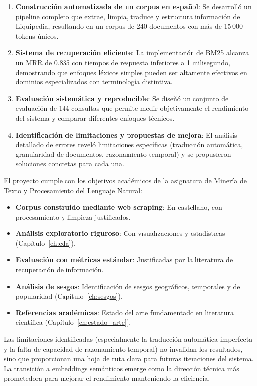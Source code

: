 \begin{enumerate}
    \item \textbf{Construcción automatizada de un corpus en español}: Se desarrolló un pipeline completo que extrae, limpia, traduce y estructura información de Liquipedia, resultando en un corpus de 240 documentos con más de 15\,000 tokens únicos.
    
    \item \textbf{Sistema de recuperación eficiente}: La implementación de BM25 alcanza un MRR de 0.835 con tiempos de respuesta inferiores a 1 milisegundo, demostrando que enfoques léxicos simples pueden ser altamente efectivos en dominios especializados con terminología distintiva.
    
    \item \textbf{Evaluación sistemática y reproducible}: Se diseñó un conjunto de evaluación de 144 consultas que permite medir objetivamente el rendimiento del sistema y comparar diferentes enfoques técnicos.
    
    \item \textbf{Identificación de limitaciones y propuestas de mejora}: El análisis detallado de errores reveló limitaciones específicas (traducción automática, granularidad de documentos, razonamiento temporal) y se propusieron soluciones concretas para cada una.
\end{enumerate}

El proyecto cumple con los objetivos académicos de la asignatura de Minería de Texto y Procesamiento del Lenguaje Natural:
\begin{itemize}
    \item \textbf{Corpus construido mediante web scraping}: En castellano, con procesamiento y limpieza justificados.
    \item \textbf{Análisis exploratorio riguroso}: Con visualizaciones y estadísticas (Capítulo~\ref{ch:eda}).
    \item \textbf{Evaluación con métricas estándar}: Justificadas por la literatura de recuperación de información.
    \item \textbf{Análisis de sesgos}: Identificación de sesgos geográficos, temporales y de popularidad (Capítulo~\ref{ch:sesgos}).
    \item \textbf{Referencias académicas}: Estado del arte fundamentado en literatura científica (Capítulo~\ref{ch:estado_arte}).
\end{itemize}

Las limitaciones identificadas (especialmente la traducción automática imperfecta y la falta de capacidad de razonamiento temporal) no invalidan los resultados, sino que proporcionan una hoja de ruta clara para futuras iteraciones del sistema. La transición a embeddings semánticos emerge como la dirección técnica más prometedora para mejorar el rendimiento manteniendo la eficiencia.

